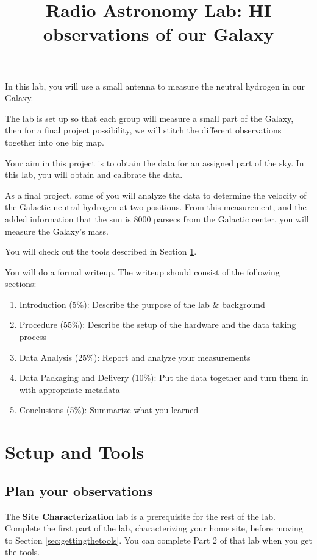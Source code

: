\documentclass[11pt]{article}
\begin{document}
\title{Radio Astronomy Lab: HI observations of our Galaxy}

In this lab, you will use a small antenna to measure the neutral hydrogen in
our Galaxy.

The lab is set up so that each group will measure a small part of the Galaxy,
then for a final project possibility, we will stitch the different observations
together into one big map.

Your aim in this project is to obtain the data for an assigned part of the sky.
In this lab, you will obtain and calibrate the data.

As a final project, some of you will analyze the data to determine the velocity
of the Galactic neutral hydrogen at two positions.  From this measurement, and
the added information that the sun is 8000 parsecs from the Galactic center,
you will measure the Galaxy's mass.

You will check out the tools described in Section \ref{sec:tools}.

You will do a formal writeup.  The writeup should consist of the following sections:
\begin{enumerate}
    \item Introduction (5\%): Describe the purpose of the lab \& background
    \item Procedure (55\%): Describe the setup of the hardware and the data taking process
    \item Data Analysis (25\%):  Report and analyze your measurements
    \item Data Packaging and Delivery (10\%): Put the data together and turn them in with appropriate metadata
    \item Conclusions (5\%): Summarize what you learned
\end{enumerate}

\section{Setup and Tools}
\label{sec:tools}

\subsection{Plan your observations}
The \textbf{Site Characterization} lab is a prerequisite for the rest of the lab.
Complete the first part of the lab, characterizing your home site,
before moving to Section \ref{sec:gettingthetools}.
You can complete Part 2 of that lab when you get the tools.
\end{document}

